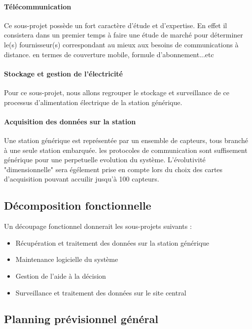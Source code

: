 \paragraph{Télécommunication\\}
Ce sous-projet possède un fort caractère d'étude et d'expertise. En effet il consistera dans un premier temps à faire une étude de marché
pour déterminer le(s) fournisseur(s) correspondant au mieux aux besoins de communications à distance. en termes de couverture mobile, formule d'abonnement...etc


\paragraph{Stockage et gestion de l’électricité\\}
Pour ce sous-projet, nous allons regrouper le stockage et surveillance de ce
processus d’alimentation électrique de la station générique.

\paragraph{Acquisition des données sur la station\\}
Une station générique est représentée par un ensemble de capteurs, tous branché à une seule station embarquée. les protocoles de communication
sont suffisement générique pour une perpetuelle evolution du système. L'évolutivité "dimensionnelle" sera égélement prise en compte lors du choix
des cartes d'acquisition pouvant accuilir jusqu'à 100 capteurs.


\subsection{Décomposition fonctionnelle}
Un découpage fonctionnel donnerait les sous-projets suivants :
\begin{itemize}
\item Récupération et traitement des données sur la station générique
\item Maintenance logicielle du système
\item Gestion de l'aide à la décision
\item Surveillance et traitement des données sur le site central
\end{itemize}

\subsection{Planning prévisionnel général}
